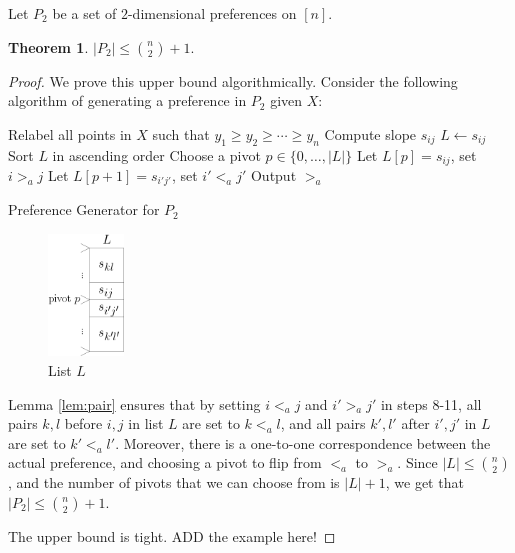 \documentclass[12pt]{article}
\newtheorem{theorem}{Theorem}
\newcommand{\sizeof}[1]{\left\lvert{#1}\right\rvert}
\newcommand{\1}[1]{\mathds{1}[{#1}]}
\begin{document}
Let $P_2$ be a set of $2$-dimensional preferences on $[n]$.

\begin{theorem} \label{thm:p2}
$\sizeof{P_2} \leq \binom{n}{2} + 1.$
\end{theorem}

\begin{proof}
We prove this upper bound algorithmically.
Consider the following algorithm of generating a preference in $P_2$ given $X$:

\begin{algorithm} \label{alg:PreGenP2}
\begin{algorithmic}[1]
	\State Relabel all points in $X$ such that $y_1 \geq y_2 \geq \cdots \geq y_n$
		\State Compute slope $s_{ij}$
			\State $L \gets s_{ij}$ 
		\EndIf
	\EndFor
	\State Sort $L$ in ascending order
	\State Choose a pivot $p \in \{0, \dots, \sizeof{L} \}$
		\State Let $L[p] = s_{ij}$, set $i >_a j$
	\EndIf
	\If {$p+1 \leq \sizeof{L}$}
		\State Let $L[p+1] = s_{i'j'}$, set $i' <_a j'$
	\EndIf
	\State Output $>_a$
\end{algorithmic}
\caption{Preference Generator for $P_2$}
\end{algorithm}

\begin{figure}
  \begin{center}
    \includegraphics[width=0.18\textwidth]{thmp2}
  \end{center}
  \vspace{20pt}
  \caption{List $L$}
\end{figure}

Lemma \ref{lem:pair} ensures that by setting $i <_a j$ and $i' >_a j'$ in steps 8-11, all pairs $k,l$ before $i,j$ in list $L$ are set to $k <_a l$, and all pairs $k', l'$ after $i', j'$ in $L$ are set to $k' <_a l'$.
Moreover, there is a one-to-one correspondence between the actual preference, and choosing a pivot to flip from $<_a$ to $>_a$.
Since $\sizeof{L} \leq \binom{n}{2}$, and the number of pivots that we can choose from is $\sizeof{L} + 1$, we get that $\sizeof{P_2} \leq \binom{n}{2} + 1$.

The upper bound is tight.
ADD the example here!
\end{proof}
\end{document}
